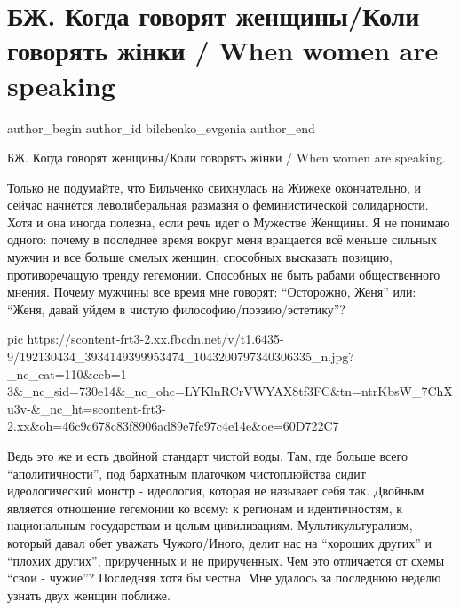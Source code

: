  
 
 
 
 
 
\section{БЖ. Когда говорят женщины/Коли говорять жінки / When women are speaking}
\label{sec:29_05_2021.fb.bilchenko_evgenia.1.when_womena_are_speaking}
\ifcmt
 author_begin
   author_id bilchenko_evgenia
 author_end
\fi

БЖ. Когда говорят женщины/Коли говорять жінки / When women are speaking.

Только не подумайте, что Бильченко свихнулась на Жижеке окончательно, и сейчас
начнется леволиберальная размазня о феминистической солидарности. Хотя и она
иногда полезна, если речь идет о Мужестве Женщины. Я не понимаю одного: почему
в последнее время вокруг меня вращается всё меньше сильных мужчин и все больше
смелых женщин, способных высказать позицию, противоречащую тренду гегемонии.
Способных не быть рабами общественного мнения. Почему мужчины все время мне
говорят: \enquote{Осторожно, Женя} или: \enquote{Женя, давай уйдем в чистую
философию/поэзию/эстетику}?

\ifcmt
  pic https://scontent-frt3-2.xx.fbcdn.net/v/t1.6435-9/192130434_3934149399953474_1043200797340306335_n.jpg?_nc_cat=110&ccb=1-3&_nc_sid=730e14&_nc_ohc=LYKlnRCrVWYAX8tf3FC&tn=ntrKbsW_7ChXu3v-&_nc_ht=scontent-frt3-2.xx&oh=46c9c678c83f8906ad89e7fc97c4e14e&oe=60D722C7
\fi

Ведь это же и есть двойной стандарт чистой воды. Там, где больше всего
\enquote{аполитичности}, под бархатным платочком чистоплюйства сидит идеологический
монстр - идеология, которая не называет себя так. Двойным является отношение
гегемонии ко всему: к регионам и идентичностям, к национальным государствам и
целым цивилизациям. Мультикультурализм, который давал обет уважать
Чужого/Иного, делит нас на \enquote{хороших других} и \enquote{плохих других}, прирученных и не
прирученных. Чем это отличается от схемы \enquote{свои - чужие}? Последняя хотя бы
честна. Мне удалось за последнюю неделю узнать двух женщин поближе.


